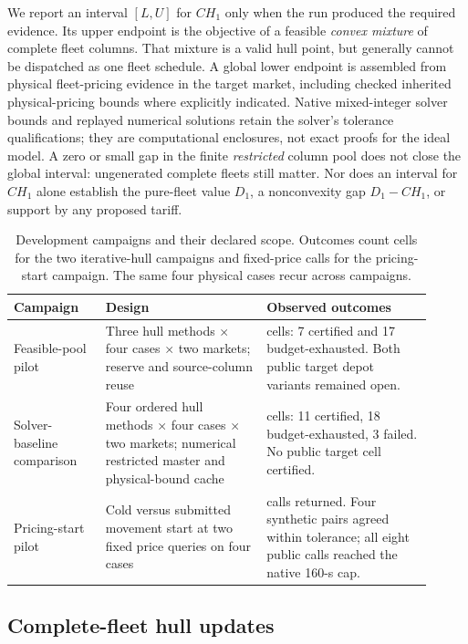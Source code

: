 We report an interval $[L,U]$ for $CH_1$ only when the run produced the required evidence.  Its upper endpoint is the objective of a feasible \emph{convex mixture} of complete fleet columns.  That mixture is a valid hull point, but generally cannot be dispatched as one fleet schedule.  A global lower endpoint is assembled from physical fleet-pricing evidence in the target market, including checked inherited physical-pricing bounds where explicitly indicated.  Native mixed-integer solver bounds and replayed numerical solutions retain the solver's tolerance qualifications; they are computational enclosures, not exact proofs for the ideal model.  A zero or small gap in the finite \emph{restricted} column pool does not close the global interval: ungenerated complete fleets still matter.  Nor does an interval for $CH_1$ alone establish the pure-fleet value $D_1$, a nonconvexity gap $D_1-CH_1$, or support by any proposed tariff.

\begin{table}[t]
\centering\small
\caption{Development campaigns and their declared scope.  Outcomes count cells for the two iterative-hull campaigns and fixed-price calls for the pricing-start campaign.  The same four physical cases recur across campaigns.}\label{tab:computational-scope}
\begin{tabular}{>{\raggedright\arraybackslash}p{0.20\linewidth}>{\raggedright\arraybackslash}p{0.35\linewidth}>{\raggedright\arraybackslash}p{0.36\linewidth}}
\toprule
Campaign & Design & Observed outcomes \\
\midrule
Feasible-pool pilot & Three hull methods $\times$ four cases $\times$ two markets; reserve and source-column reuse & 24 cells: 7 certified and 17 budget-exhausted.  Both public target depot variants remained open. \\
Solver-baseline comparison & Four ordered hull methods $\times$ four cases $\times$ two markets; numerical restricted master and physical-bound cache & 32 cells: 11 certified, 18 budget-exhausted, 3 failed.  No public target cell certified. \\
Pricing-start pilot & Cold versus submitted movement start at two fixed price queries on four cases & 16 calls returned.  Four synthetic pairs agreed within tolerance; all eight public calls reached the native 160-s cap. \\
\bottomrule
\end{tabular}
\end{table}

\subsection{Complete-fleet hull updates}

